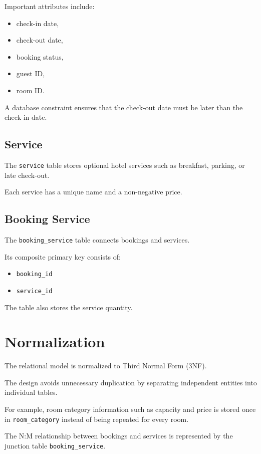 \documentclass[12pt,a4paper]{article}
\begin{document}
Important attributes include:

\begin{itemize}
    \item check-in date,
    \item check-out date,
    \item booking status,
    \item guest ID,
    \item room ID.
\end{itemize}

A database constraint ensures that the check-out date must be later than
the check-in date.

\subsection{Service}

The \texttt{service} table stores optional hotel services such as
breakfast, parking, or late check-out.

Each service has a unique name and a non-negative price.

\subsection{Booking Service}

The \texttt{booking\_service} table connects bookings and services.

Its composite primary key consists of:

\begin{itemize}
    \item \texttt{booking\_id}
    \item \texttt{service\_id}
\end{itemize}

The table also stores the service quantity.

\section{Normalization}

The relational model is normalized to Third Normal Form (3NF).

The design avoids unnecessary duplication by separating independent
entities into individual tables.

For example, room category information such as capacity and price is
stored once in \texttt{room\_category} instead of being repeated for
every room.

The N:M relationship between bookings and services is represented by the
junction table \texttt{booking\_service}.
\end{document}
